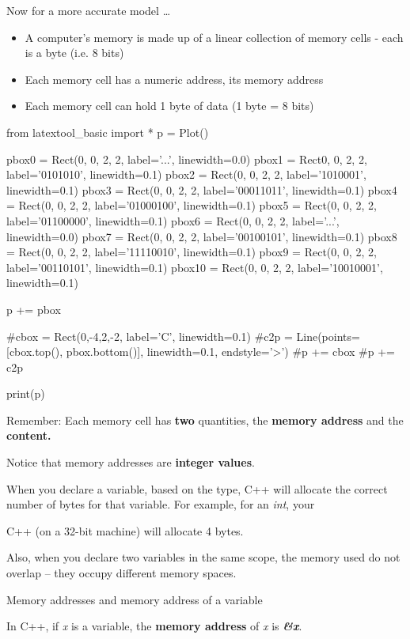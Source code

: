 Now for a more accurate model \ldots{}

\begin{itemize}
\tightlist
\item
  A computer's memory is made up of a linear collection of memory cells
  - each is a byte (i.e. 8 bits)
\item
  Each memory cell has a numeric address, its memory address
\item
  Each memory cell can hold 1 byte of data (1 byte = 8 bits)
\end{itemize}

\begin{python}
from latextool_basic import *
p = Plot()

pbox0 = Rect(0, 0, 2, 2, label='...', linewidth=0.0)
pbox1 = Rect0, 0, 2, 2, label='0101010', linewidth=0.1)
pbox2 = Rect(0, 0, 2, 2, label='1010001', linewidth=0.1)
pbox3 = Rect(0, 0, 2, 2, label='00011011', linewidth=0.1)
pbox4 = Rect(0, 0, 2, 2, label='01000100', linewidth=0.1)
pbox5 = Rect(0, 0, 2, 2, label='01100000', linewidth=0.1)
pbox6 = Rect(0, 0, 2, 2, label='...', linewidth=0.0)
pbox7 = Rect(0, 0, 2, 2, label='00100101', linewidth=0.1)
pbox8 = Rect(0, 0, 2, 2, label='11110010', linewidth=0.1)
pbox9 = Rect(0, 0, 2, 2, label='00110101', linewidth=0.1)
pbox10 = Rect(0, 0, 2, 2, label='10010001', linewidth=0.1)

p += pbox

#cbox = Rect(0,-4,2,-2, label='C', linewidth=0.1)
#c2p = Line(points=[cbox.top(), pbox.bottom()], linewidth=0.1, endstyle='>')
#p += cbox
#p += c2p

print(p)
\end{python}

Remember: Each memory cell has \textbf{two} quantities, the \textbf{memory address} and the \textbf{content.}

Notice that memory addresses are \textbf{integer values}.

When you declare a variable, based on the type, C++ will allocate the correct number of bytes for that variable. For example, for an \emph{int}, your

C++ (on a 32-bit machine) will allocate 4 bytes.

Also, when you declare two variables in the same scope, the memory used do not overlap -- they occupy different memory spaces.

Memory addresses and memory address of a variable

In C++, if \emph{x} is a variable, the \textbf{memory address} of
\emph{x} is \emph{\textbf{\&x}}.

